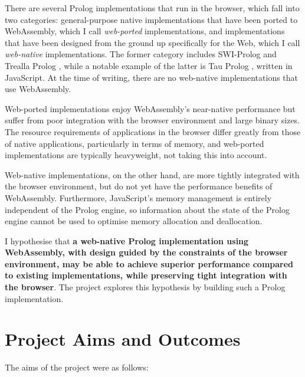 There are several Prolog implementations that run in the browser, which fall into two categories: general-purpose native implementations that have been ported to WebAssembly, which I call \emph{web-ported} implementations, and implementations that have been designed from the ground up specifically for the Web, which I call \emph{web-native} implementations. The former category includes SWI-Prolog \cite{wielemakerSWIProlog2012} and Trealla Prolog \cite{davisonTreallaProloghttps2020}, while a notable example of the latter is Tau Prolog \cite{riazaTauPrologProlog2024}, written in JavaScript. At the time of writing, there are no web-native implementations that use WebAssembly.

Web-ported implementations enjoy WebAssembly's near-native performance but suffer from poor integration with the browser environment and large binary sizes. The resource requirements of applications in the browser differ greatly from those of native applications, particularly in terms of memory, and web-ported implementations are typically heavyweight, not taking this into account.

Web-native implementations, on the other hand, are more tightly integrated with the browser environment, but do not yet have the performance benefits of WebAssembly. Furthermore, JavaScript's memory management is entirely independent of the Prolog engine, so information about the state of the Prolog engine cannot be used to optimise memory allocation and deallocation.

I hypothesise that \textbf{a web-native Prolog implementation using WebAssembly, with design guided by the constraints of the browser environment, may be able to achieve superior performance compared to existing implementations, while preserving tight integration with the browser}. The project explores this hypothesis by building such a Prolog implementation.

\section{Project Aims and Outcomes}

The aims of the project were as follows:

